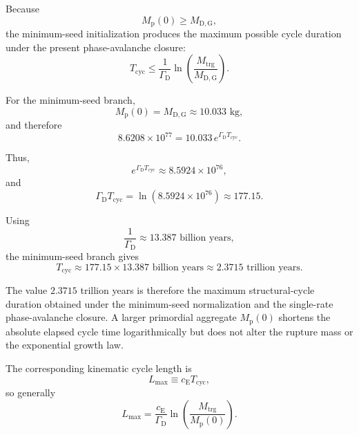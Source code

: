 Because
\begin{equation}
    M_{\mathrm{p}}(0)
    \geq
    M_{\mathrm{D,G}},
\end{equation}
the minimum-seed initialization produces the maximum possible cycle duration under the present phase-avalanche closure:
\begin{equation}
    T_{\mathrm{cyc}}
    \leq
    \frac{1}{\Gamma_{\mathrm{D}}}
    \ln\left(
        \frac{M_{\mathrm{trg}}}
        {M_{\mathrm{D,G}}}
    \right).
\end{equation}

For the minimum-seed branch,
\begin{equation}
    M_{\mathrm{p}}(0)
    =
    M_{\mathrm{D,G}}
    \approx
    10.033
    \text{ kg},
\end{equation}
and therefore
\begin{equation}
    8.6208\times10^{77}
    =
    10.033\,
    e^{\Gamma_{\mathrm{D}}T_{\mathrm{cyc}}}.
\end{equation}

Thus,
\begin{equation}
    e^{\Gamma_{\mathrm{D}}T_{\mathrm{cyc}}}
    \approx
    8.5924\times10^{76},
\end{equation}
and
\begin{equation}
    \Gamma_{\mathrm{D}}T_{\mathrm{cyc}}
    =
    \ln\left(
        8.5924\times10^{76}
    \right)
    \approx
    177.15.
\end{equation}

Using
\begin{equation}
    \frac{1}{\Gamma_{\mathrm{D}}}
    \approx
    13.387
    \text{ billion years},
\end{equation}
the minimum-seed branch gives
\begin{equation}
    T_{\mathrm{cyc}}
    \approx
    177.15
    \times
    13.387
    \text{ billion years}
    \approx
    2.3715
    \text{ trillion years}.
\end{equation}

The value $2.3715$ trillion years is therefore the maximum structural-cycle duration obtained under the minimum-seed normalization and the single-rate phase-avalanche closure. A larger primordial aggregate $M_{\mathrm{p}}(0)$ shortens the absolute elapsed cycle time logarithmically but does not alter the rupture mass or the exponential growth law.

The corresponding kinematic cycle length is
\begin{equation}
    L_{\mathrm{max}}
    \equiv
    c_{\mathrm{E}}T_{\mathrm{cyc}},
\end{equation}
so generally
\begin{equation}
    L_{\mathrm{max}}
    =
    \frac{c_{\mathrm{E}}}{\Gamma_{\mathrm{D}}}
    \ln\left(
        \frac{M_{\mathrm{trg}}}
        {M_{\mathrm{p}}(0)}
    \right).
\end{equation}

